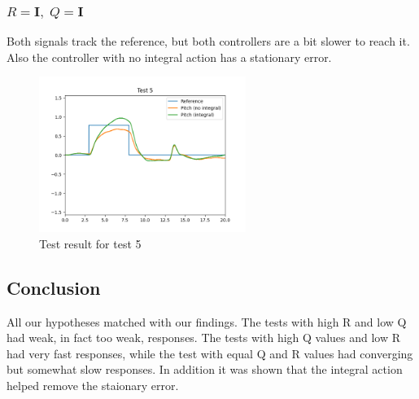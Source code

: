 \subsubsection*{$R = \mathbf{I},\; Q=\mathbf{I}$}
Both signals track the reference, but both controllers are a bit slower to reach it. Also the controller with no integral action has a stationary error.
\begin{figure}[H]
	\centering
	\includegraphics[width=0.6\textwidth]{figures/lab2-test5.png}
	\caption{Test result for test 5}
	\label{}
\end{figure}

\subsection{Conclusion}
All our hypotheses matched with our findings. The tests with high R and low Q had weak, in fact too weak, responses. The tests with high Q values and low R had very fast responses, while the test with equal Q and R values had converging but somewhat slow responses. In addition it was shown that the integral action helped remove the staionary error.